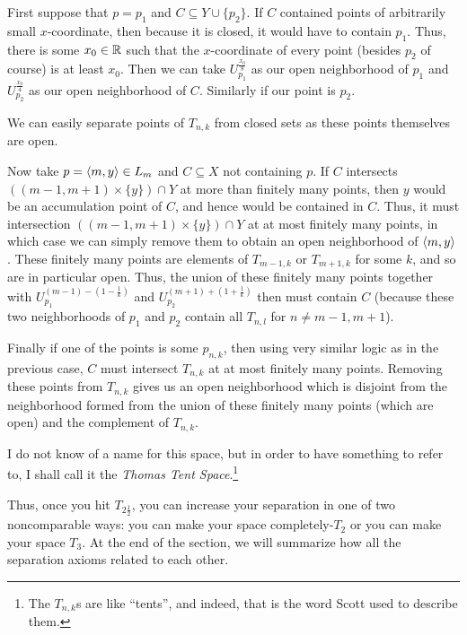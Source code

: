 \begin{exm}
First suppose that $p=p_1$ and $C\subseteq Y\cup \{ p_2\}$.  If $C$ contained points of arbitrarily small $x$-coordinate, then because it is closed, it would have to contain $p_1$.  Thus, there is some $x_0\in \mathbb{R}$ such that the $x$-coordinate of every point (besides $p_2$ of course) is at least $x_0$.  Then we can take $U_{p_1}^{\frac{x_0}{8}}$ as our open neighborhood of $p_1$ and $U_{p_2}^{\frac{x_0}{4}}$ as our open neighborhood of $C$.  Similarly if our point is $p_2$.

We can easily separate points of $T_{n,k}$ from closed sets as these points themselves are open.

Now take $p=\langle m,y\rangle\in L_m$ and $C\subseteq X$ not containing $p$.  If $C$ intersects $((m-1,m+1)\times \{ y\} )\cap Y$ at more than finitely many points, then $y$ would be an accumulation point of $C$, and hence would be contained in $C$.  Thus, it must intersection $((m-1,m+1)\times \{ y\})\cap Y$ at at most finitely many points, in which case we can simply remove them to obtain an open neighborhood of $\langle m,y\rangle$.  These finitely many points are elements of $T_{m-1,k}$ or $T_{m+1,k}$ for some $k$, and so are in particular open.  Thus, the union of these finitely many points together with $U_{p_1}^{(m-1)-(1-\frac{1}{k})}$ and $U_{p_2}^{(m+1)+(1+\frac{1}{k})}$ then must contain $C$ (because these two neighborhoods of $p_1$ and $p_2$ contain all $T_{n,l}$ for $n\neq m-1,m+1$).

Finally if one of the points is some $p_{n,k}$, then using very similar logic as in the previous case, $C$ must intersect $T_{n,k}$ at at most finitely many points.  Removing these points from $T_{n,k}$ gives us an open neighborhood which is disjoint from the neighborhood formed from the union of these finitely many points (which are open) and the complement of $T_{n,k}$.
\begin{rmk}
I do not know of a name for this space, but in order to have something to refer to, I shall call it the \emph{Thomas Tent Space}.\footnote{The $T_{n,k}$s are like ``tents'', and indeed, that is the word Scott used to describe them.}
\end{rmk}
\end{exm}
Thus, once you hit $T_{2\frac{1}{2}}$, you can increase your separation in one of two noncomparable ways:  you can make your space completely-$T_2$ or you can make your space $T_3$.  At the end of the section, we will summarize how all the separation axioms related to each other.
